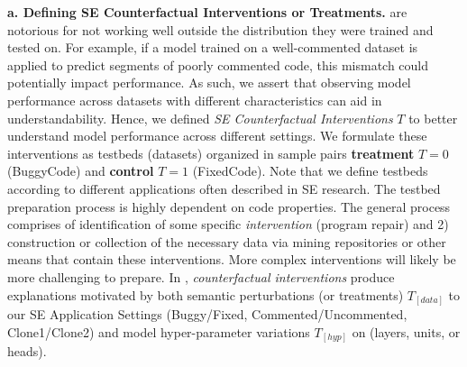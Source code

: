 \textbf{a. Defining SE Counterfactual Interventions or Treatments.}
\nlms are notorious for not working well outside the distribution they were trained and tested on. For example, if a model trained on a well-commented dataset is applied to predict segments of poorly commented code, this mismatch could potentially impact performance. As such, we assert that observing model performance across datasets with different characteristics can aid in understandability. Hence, we defined \textit{SE Counterfactual Interventions} $T$ to better understand model performance across different settings. We formulate these interventions as testbeds (\ie datasets) organized in sample pairs \textbf{treatment} $T=0$ (\ie BuggyCode) and \textbf{control} $T=1$ (\ie FixedCode). Note that we define testbeds according to different applications often described in SE research. The testbed preparation process is highly dependent on code properties. The general process comprises of identification of some specific \textit{intervention} (\ie program repair) and 2) construction or collection of the necessary data via mining repositories or other means that contain these interventions. More complex interventions will likely be more challenging to prepare. In \codegen, \textit{counterfactual interventions} produce explanations motivated by both semantic perturbations (or treatments) $T_{[data]}$ to our SE Application Settings (\eg Buggy/Fixed, Commented/Uncommented, Clone1/Clone2) and model hyper-parameter variations $T_{[hyp]}$ on \nlms  (\eg layers, units, or heads).

